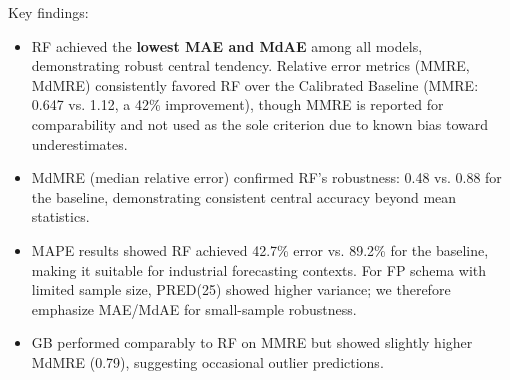 \documentclass{ieeeaccess}
\begin{document}
Key findings:
\begin{itemize}[leftmargin=1.5em]
    \item RF achieved the \textbf{lowest MAE and MdAE} among all models, 
    demonstrating robust central tendency. 
    Relative error metrics (MMRE, MdMRE) consistently favored RF over the Calibrated Baseline 
    (MMRE: 0.647 vs. 1.12, a 42\% improvement), 
    though MMRE is reported for comparability and not used as the sole criterion due to known bias toward underestimates.
    \item MdMRE (median relative error) confirmed RF's robustness: 0.48 vs. 0.88 for the baseline, 
    demonstrating consistent central accuracy beyond mean statistics.
    \item MAPE results showed RF achieved 42.7\% error vs. 89.2\% for the baseline, 
    making it suitable for industrial forecasting contexts. 
    For FP schema with limited sample size, PRED(25) showed higher variance; 
    we therefore emphasize MAE/MdAE for small-sample robustness.
    \item GB performed comparably to RF on MMRE but showed slightly higher MdMRE (0.79), 
    suggesting occasional outlier predictions.
\end{itemize}
\end{document}
